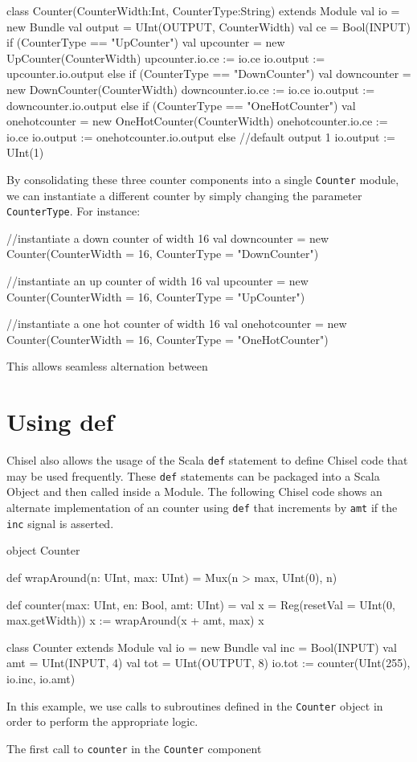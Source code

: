 \documentclass[twocolumn, 10pt]{article}
\begin{document}
\begin{scala}
class Counter(CounterWidth:Int, CounterType:String) extends Module {
  val io = new Bundle {
    val output = UInt(OUTPUT, CounterWidth)
    val ce     = Bool(INPUT)
  }
  if (CounterType == "UpCounter") {
     val upcounter = new UpCounter(CounterWidth)
     upcounter.io.ce := io.ce
     io.output := upcounter.io.output
  } else if (CounterType == "DownCounter") {
    val downcounter = new DownCounter(CounterWidth)
    downcounter.io.ce := io.ce
    io.output := downcounter.io.output
  } else if (CounterType == "OneHotCounter") {
    val onehotcounter = new OneHotCounter(CounterWidth)
    onehotcounter.io.ce := io.ce
    io.output := onehotcounter.io.output
  } else {
    //default output 1
    io.output := UInt(1)
  }
}
\end{scala}

By consolidating these three counter components into a single \verb+Counter+ module, we can instantiate a different counter by simply changing the parameter \verb+CounterType+. For instance:

\begin{scala}
//instantiate a down counter of width 16
val downcounter = new Counter(CounterWidth = 16, CounterType = "DownCounter")

//instantiate an up counter of width 16
val upcounter = new Counter(CounterWidth = 16, CounterType = "UpCounter")

//instantiate a one hot counter of width 16
val onehotcounter = new Counter(CounterWidth = 16, CounterType = "OneHotCounter")
\end{scala}

This allows seamless alternation between

\section{Using def}

Chisel also allows the usage of the Scala \verb+def+ statement to define Chisel code that may be used frequently. These \verb+def+ statements can be packaged into a Scala Object and then called inside a Module. The following Chisel code shows an alternate implementation of an counter using \verb+def+ that increments by \verb+amt+ if the \verb+inc+ signal is asserted.

\begin{scala} 
object Counter {

  def wrapAround(n: UInt, max: UInt) = 
    Mux(n > max, UInt(0), n)

  def counter(max: UInt, en: Bool, amt: UInt) = {
    val x = Reg(resetVal = UInt(0, max.getWidth))
    x := wrapAround(x + amt, max)
    x
  }
}

class Counter extends Module {
  val io = new Bundle {
    val inc = Bool(INPUT)
    val amt = UInt(INPUT,  4)
    val tot = UInt(OUTPUT, 8)
  }
  io.tot := counter(UInt(255), io.inc, io.amt)
}
\end{scala}
 
In this example, we use calls to subroutines defined in the \verb+Counter+ object in order to perform the appropriate logic. 

The first call to \verb+counter+ in the \verb+Counter+ component 
\end{document}
